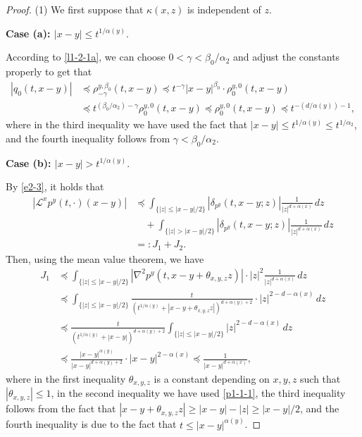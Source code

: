 \documentclass[a4paper,11pt]{amsart}
\renewcommand{\le}{\leqslant}
\renewcommand{\ge}{\geqslant}
\newcommand{\B}{\beta}
\newcommand{\p}{\preceq}
\newcommand{\K}{\kappa}
\newcommand{\A}{\alpha}
\newcommand{\G}{\gamma}
\def\LL{{\mathcal L}}
\theoremstyle{definition}
\begin{document}
\begin{proof}
(1) We first suppose that $\K(x,z)$ is independent of $z$.

{\bf Case (a): $|x-y|\le t^{{1}/{\A(y)}}.$}

According to \eqref{l1-2-1a}, we can choose $0<\G<{\B_0}/{\A_2}$ and adjust the constants properly to get that
\begin{equation}\label{p2-1-2a}
\begin{split}
|q_0(t,x-y)|&\p \rho^{y,\B_0}_{-\G}(t,x-y)\p t^{-\G}|x-y|^{\B_0}\cdot\rho^{y,0}_{0}(t,x-y)\\
&\p t^{({\B_0}/{\A_2})-\G}\rho^{y,0}_0(t,x-y)\p \rho^{y,0}_0(t,x-y)\p t^{-({d}/{\A(y)})-1},
\end{split}
\end{equation}
where in the third inequality we have used the fact that $|x-y|\le t^{{1}/{\A(y)}}\le t^{{1}/{\A_2}}$, and the
fourth inequality follows from $\G<{\B_0}/{\A_2}$.

{\bf Case (b): $|x-y|>t^{{1}/{\A(y)}}.$}

By \eqref{e2-3}, it holds that
\begin{equation}\label{p2-1-2}
\begin{split}
| \LL^x p^y(t,\cdot)(x-y)|&
\p \int_{\{|z|\le {|x-y|}/{2}\}}\left|
\delta_{p^y}\left(t,x-y;z\right)\right|\frac{1}{|z|^{d+\A(x)}}\,dz\\
&\quad +\int_{\{|z|> {|x-y|}/{2}\}}\left|
\delta_{p^y}\left(t,x-y;z\right)\right|\frac{1}{|z|^{d+\A(x)}}\,dz\\
&=:J_1+J_2.
\end{split}
\end{equation}
Then, using the mean value theorem, we have
\begin{align*}
J_1&\p \int_{\{|z|\le {|x-y|}/{2}\}}
\left|\nabla^2 p^y(t,x-y+\theta_{x,y,z} z)\right|\cdot |z|^2\frac{1}{|z|^{d+\A(x)}}\,dz\\
&\p \int_{\{|z|\le {|x-y|}/{2}\}}
\frac{t}{\left(t^{{1}/{\A(y)}}+|x-y+\theta_{x,y,z} z|\right)^{d+\A(y)+2}}
\cdot |z|^{2-d-\A(x)}\,dz\\
&\p \frac{t}{\left(t^{{1}/{\A(y)}}+|x-y|\right)^{d+\A(y)+2}}
\int_{\{|z|\le {|x-y|}/{2}\}} |z|^{2-d-\A(x)}\,dz\\
&\p \frac{|x-y|^{\A(y)}}{|x-y|^{d+\A(y)+2}}\cdot |x-y|^{2-\A(x)}\p \frac{1}{|x-y|^{d+\A(x)}},
\end{align*}
where in the first inequality  $\theta_{x,y,z}$ is a constant depending on $x,y,z$ such that
$|\theta_{x,y,z}|\le 1$, in the second inequality we have used \eqref{p1-1-1}, the third inequality follows
from the fact that $|x-y+\theta_{x,y,z} z|\ge |x-y|-|z|\ge {|x-y|}/{2}$, and the fourth inequality is due to
the fact that $t\le |x-y|^{\A(y)}$.



\end{proof}
\end{document}
